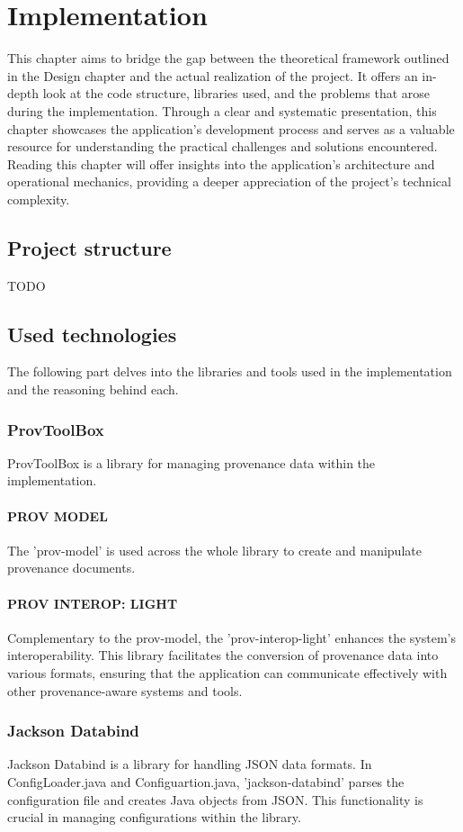 \documentclass[
  digital,     %
  oneside,     %
  nosansbold,  %
  nocolorbold, %
  lof,         %
  lot,         %
]{fithesis4}
\begin{document}
\chapter{Implementation}
\shorthandoff{-}
This chapter aims to bridge the gap between the theoretical framework outlined in the Design chapter and the actual realization of the project. It offers an in-depth look at the code structure, libraries used, and the problems that arose during the implementation. Through a clear and systematic presentation, this chapter showcases the application's development process and serves as a valuable resource for understanding the practical challenges and solutions encountered. Reading this chapter will offer insights into the application's architecture and operational mechanics, providing a deeper appreciation of the project's technical complexity.

\section{Project structure}
TODO

\section{Used technologies}
The following part delves into the libraries and tools used in the implementation and the reasoning behind each.
\subsection{ProvToolBox}
ProvToolBox is a library for managing provenance data within the implementation.  
\subsubsection{PROV MODEL}
The 'prov-model' is used across the whole library to create and manipulate provenance documents.
\subsubsection{PROV INTEROP: LIGHT}
Complementary to the prov-model, the 'prov-interop-light' enhances the system's interoperability. This library facilitates the conversion of provenance data into various formats, ensuring that the application can communicate effectively with other provenance-aware systems and tools.
\subsection{Jackson Databind}
Jackson Databind is a library for handling JSON data formats. In ConfigLoader.java and Configuartion.java, 'jackson-databind' parses the configuration file and creates Java objects from JSON. This functionality is crucial in managing configurations within the library.
\end{document}

